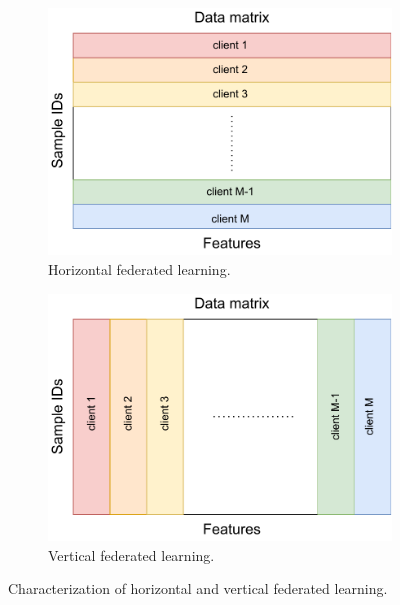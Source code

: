 \begin{figure}[t] 
    \begin{subfigure}{.48\textwidth}
      \centering
      \includegraphics[width=\linewidth]{./figures/hfl_illustration.pdf}
      \captionsetup{justification=centering}
      \caption{Horizontal federated learning.}
      \label{fig:hfl}
    \end{subfigure}
    \hfill
    \begin{subfigure}{.48\textwidth}
      \centering
      \includegraphics[width=\linewidth]{./figures/vfl_illustration.pdf}
      \captionsetup{justification=centering}
      \caption{Vertical federated learning.}
      \label{fig:vfl}
    \end{subfigure}
    \captionsetup{justification=centering}
    \caption{Characterization of horizontal and vertical federated learning.}
    \label{fig:hfl_and_vfl}
\end{figure}

